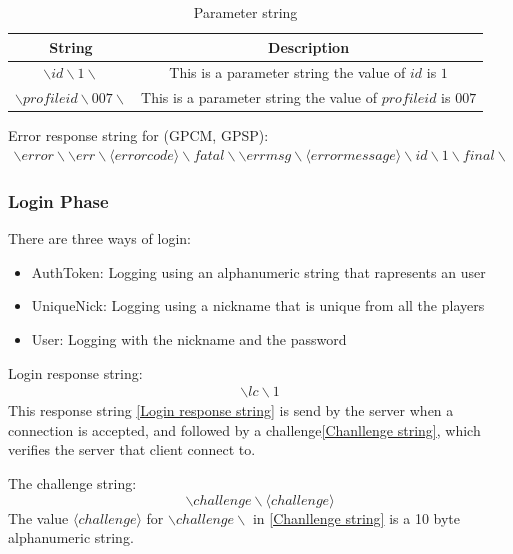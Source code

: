 \documentclass[oneside,titlepage,a4paper]{report} %
\begin{document}
\begin{table}[H]
	\centering
	\begin{tabular}{|c|c|}
		\hline 
		String&Description  \\ 
		\hline 
		$ \backslash id \backslash 1 \backslash $& This is a parameter string the value of $ id $ is $ 1 $ \\ 		
		\hline 
		$ \backslash profileid \backslash 007 \backslash $ & This is a parameter string the value of $ profileid $ is $ 007 $ \\
		\hline
	\end{tabular} 
	\caption{Parameter string}
	\label{Parameter string}
\end{table}

Error response string for (GPCM, GPSP):
\begin{equation}
\begin{split}
\backslash error \backslash\backslash err \backslash \langle error code \rangle \backslash fatal\backslash\backslash errmsg \backslash \langle error message \rangle \backslash id\backslash 1 \backslash final \backslash
\end{split}	
\end{equation}
\subsubsection{Login Phase}
There are three ways of login:
\begin{itemize}
	\item AuthToken: Logging using an alphanumeric string that rapresents an user
	\item 	UniqueNick: Logging using a nickname that is unique from all the players
	\item User: Logging with the nickname and the password
\end{itemize}


Login response string: 
\begin{equation}\label{Login response string}
	\begin{split}
		\backslash lc \backslash 1
	\end{split}	
\end{equation}
This response string \ref{Login response string} is send by the server when a connection is accepted, and followed by a challenge\ref{Chanllenge string}, which verifies the server that client connect to.

The challenge string:
\begin{equation}\label{Chanllenge string}
	\backslash challenge \backslash \langle challenge \rangle
\end{equation}
The value $ \langle challenge \rangle $ for $ \backslash challenge \backslash $ in \ref{Chanllenge string} is a 10 byte alphanumeric string.
\end{document}
